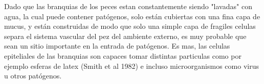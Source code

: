 Dado que las branquias de los peces estan constantemente siendo "lavadas" con agua, la cual puede contener patógenos, solo están cubiertas con una fina capa de mucus, y están construidas de modo que solo una simple capa de fragiles celulas separa el sistema vascular del pez del ambiente externo, es muy probable que sean un sitio importante en la entrada de patógenos. Es mas, las celulas epiteliales de las branquias son capaces tomar distintas particulas como por ejemplo esferas de latex (Smith et al 1982) e incluso microorganismos como virus u otros patógenos.
